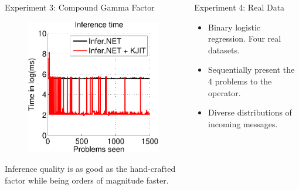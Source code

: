 \documentclass[english]{beamer}
\begin{document}
\begin{frame}
\begin{columns}[t]
\begin{block}{ Experiment 3: Compound Gamma Factor }
\begin{figure}[ht]
{  \includegraphics[width=9cm]{online/cg_inference_time-crop}
  }
  \label{fig:cg_performance}
\end{figure}

\vspace{5mm}
Inference quality is as good as the hand-crafted factor while being orders of 
magnitude faster.
\end{block}

\begin{block}{ Experiment 4: Real Data}
\begin{itemize}
    \item Binary logistic regression.  Four real datasets.     
    \item Sequentially present the 4 problems to the operator.
    \item Diverse distributions of incoming messages.
\end{itemize}


\end{block}
\end{columns}
\end{frame}
\end{document}
